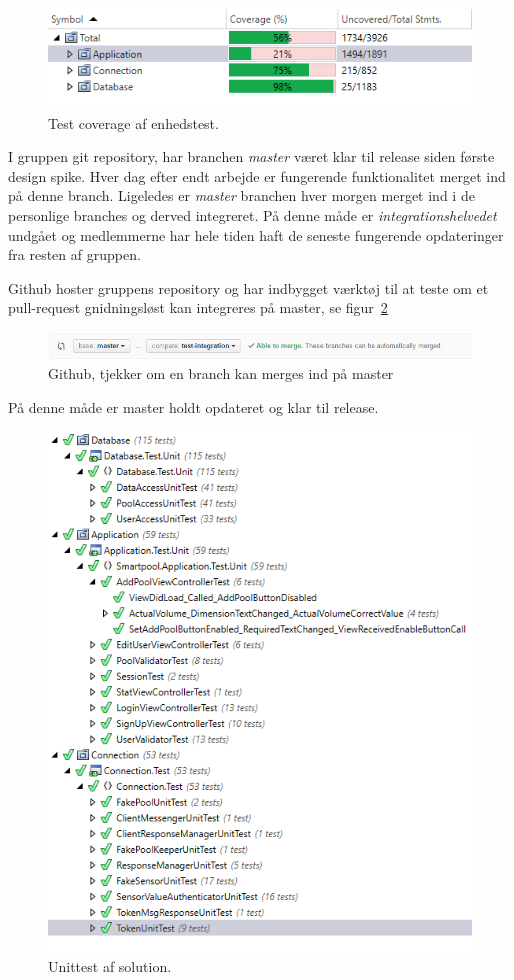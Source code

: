 \begin{figure}[h]
	\centering
	\includegraphics[width=0.8\linewidth]{figs/test/coverage}
	\caption{Test coverage af enhedstest.}
	\label{fig:coverage}
\end{figure}

I gruppen git repository, har branchen \textit{master} været klar til release siden første design spike. Hver dag efter endt arbejde er fungerende funktionalitet merget ind på denne branch. Ligeledes er \textit{master} branchen hver morgen merget ind i de personlige branches og derved integreret. På denne måde er \textit{integrationshelvedet} undgået og medlemmerne har hele tiden haft de seneste fungerende opdateringer fra resten af gruppen.

Github hoster gruppens repository og har indbygget værktøj til at teste om et pull-request gnidningsløst kan integreres på master, se figur~\ref{fig:gitmerge}

\begin{figure}[h]
\centering
\includegraphics[width=\linewidth]{figs/test/gitmerge.png}
\caption{Github, tjekker om en branch kan merges ind på master}
\label{fig:gitmerge}
\end{figure}

På denne måde er master holdt opdateret og klar til release.

\begin{figure}[h]
	\centering
	\includegraphics[width=0.5\linewidth]{figs/test/vsUnittest}
	\caption{Unittest af solution.}
	\label{fig:coverage}
\end{figure}




